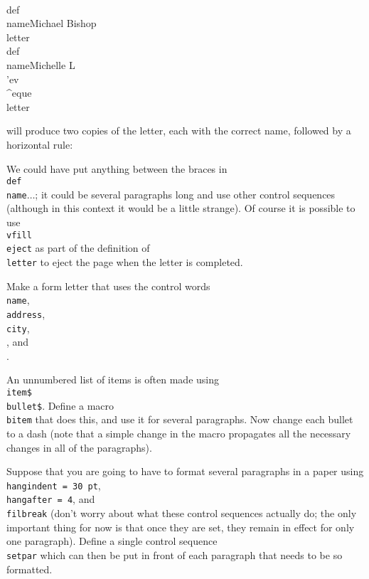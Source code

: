 \beginuser 
\\def\\name\lb Michael Bishop\rb 
\\letter 
\\def\\name\lb Michelle L\\'ev\\\^{}eque\rb 
\\letter 
\enduser 
 
\noindent will produce two copies of the letter, each with the 
correct name, followed by a horizontal rule: 
 
\def\name{Michael Bishop} 
\goodbreak 
\def\name{Michelle L\'ev\^eque} 
 
We could have put anything between the braces in 
{\tt \\def\\name\lb$\ldots$\rb}; it could be several paragraphs 
long and use other control sequences (although in this context it 
would be a little strange). Of course it is possible to use {\tt 
\\vfill \\eject} as part of the definition of {\tt \\letter} to 
eject the page when the letter is completed. 
 
\exercise Make a form letter that uses the control words {\tt \\name}, 
{\tt \\address}, {\tt \\city}, {\tt \\\province}, and {\tt 
\\\postcode}. 
 
\exercise An unnumbered list of items is often made 
using {\tt \\item\lb\$\\bullet\$\rb}.  Define a macro {\tt \\bitem} 
that does this, and use it for several paragraphs. Now change 
each bullet to a dash (note that a simple change in the macro 
propagates all the necessary changes in all of the paragraphs). 
 
\exercise Suppose that you are going to have to format several 
paragraphs in a paper using {\tt \\hangindent = 30 pt}, {\tt \\hangafter 
= 4}, and {\tt \\filbreak} (don't worry about what 
these control sequences actually do; the only important thing 
for now is that once they are set, they remain in effect for only 
one paragraph).  Define a single control sequence {\tt \\setpar} 
which can then be put in front of each paragraph that needs to be 
so formatted. 
 
